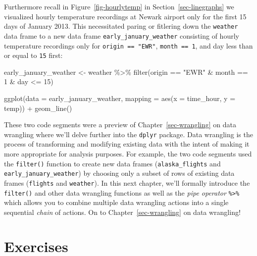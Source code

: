 \documentclass[
  letterpaper,
  DIV=11,
  numbers=noendperiod]{scrreprt}
\newenvironment{Shaded}{\begin{snugshade}}{\end{snugshade}}
\newcommand{\AttributeTok}[1]{\textcolor[rgb]{0.40,0.45,0.13}{#1}}
\newcommand{\DecValTok}[1]{\textcolor[rgb]{0.68,0.00,0.00}{#1}}
\newcommand{\FunctionTok}[1]{\textcolor[rgb]{0.28,0.35,0.67}{#1}}
\newcommand{\NormalTok}[1]{\textcolor[rgb]{0.00,0.23,0.31}{#1}}
\newcommand{\OtherTok}[1]{\textcolor[rgb]{0.00,0.23,0.31}{#1}}
\newcommand{\SpecialCharTok}[1]{\textcolor[rgb]{0.37,0.37,0.37}{#1}}
\newcommand{\StringTok}[1]{\textcolor[rgb]{0.13,0.47,0.30}{#1}}
\theoremstyle{definition}
\theoremstyle{remark}
\begin{document}
Furthermore recall in Figure~\ref{fig-hourlytemp} in
Section~\ref{sec-linegraphs} we visualized hourly temperature recordings
at Newark airport only for the first 15 days of January 2013. This
necessitated paring or fitlering down the \texttt{weather} data frame to
a new data frame \texttt{early\_january\_weather} consisting of hourly
temperature recordings only for \texttt{origin\ ==\ "EWR"},
\texttt{month\ ==\ 1}, and day less than or equal to \texttt{15} first:

\begin{Shaded}
\begin{Highlighting}[]
\NormalTok{early\_january\_weather }\OtherTok{\textless{}{-}}\NormalTok{ weather }\SpecialCharTok{\%\textgreater{}\%} 
  \FunctionTok{filter}\NormalTok{(origin }\SpecialCharTok{==} \StringTok{"EWR"} \SpecialCharTok{\&}\NormalTok{ month }\SpecialCharTok{==} \DecValTok{1} \SpecialCharTok{\&}\NormalTok{ day }\SpecialCharTok{\textless{}=} \DecValTok{15}\NormalTok{)}

\FunctionTok{ggplot}\NormalTok{(}\AttributeTok{data =}\NormalTok{ early\_january\_weather, }\AttributeTok{mapping =} \FunctionTok{aes}\NormalTok{(}\AttributeTok{x =}\NormalTok{ time\_hour, }\AttributeTok{y =}\NormalTok{ temp)) }\SpecialCharTok{+}
  \FunctionTok{geom\_line}\NormalTok{()}
\end{Highlighting}
\end{Shaded}

These two code segments were a preview of Chapter~\ref{sec-wrangling} on
data wrangling where we'll delve further into the \texttt{dplyr}
package. Data wrangling is the process of transforming and modifying
existing data with the intent of making it more appropriate for analysis
purposes. For example, the two code segments used the \texttt{filter()}
function to create new data frames (\texttt{alaska\_flights} and
\texttt{early\_january\_weather}) by choosing only a subset of rows of
existing data frames (\texttt{flights} and \texttt{weather}). In this
next chapter, we'll formally introduce the \texttt{filter()} and other
data wrangling functions as well as the \emph{pipe operator}
\texttt{\%\textgreater{}\%} which allows you to combine multiple data
wrangling actions into a single sequential \emph{chain} of actions. On
to Chapter~\ref{sec-wrangling} on data wrangling!

\hypertarget{sec-ex02}{%
\section{Exercises}\label{sec-ex02}}
\end{document}

